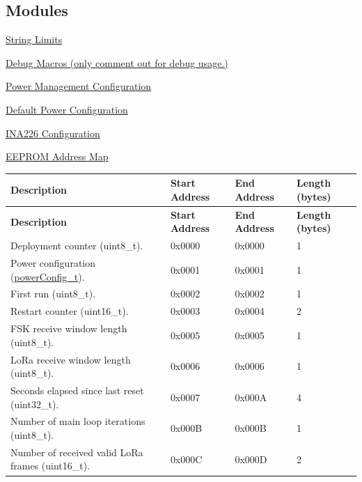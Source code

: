 \subsection*{Modules}
\begin{DoxyCompactItemize}
\item 
\hyperlink{group__defines__string__memory__limits}{String Limits}
\item 
\hyperlink{group__defines__debug__macros}{Debug Macros (only comment out for debug usage.)}
\item 
\hyperlink{group__defines__power__management__configuration}{Power Management Configuration}
\item 
\hyperlink{group__defines__default__power__configuration}{Default Power Configuration}
\item 
\hyperlink{group__defines__ina226__configuration}{I\+N\+A226 Configuration}
\item 
\hyperlink{group__defines__eeprom__address__map}{E\+E\+P\+R\+O\+M Address Map}
\begin{DoxyCompactList}\small\item\em \tabulinesep=1mm
\begin{longtabu} spread 0pt [c]{*{4}{|X[-1]}|}
\hline
\rowcolor{\tableheadbgcolor}\textbf{ Description}&\textbf{ Start Address}&\textbf{ End Address}&\textbf{ Length (bytes)  }\\
\endfirsthead
\hline
\endfoot
\hline
\rowcolor{\tableheadbgcolor}\textbf{ Description}&\textbf{ Start Address}&\textbf{ End Address}&\textbf{ Length (bytes)  }\\
\endhead
Deployment counter (uint8\+\_\+t).&0x0000&0x0000&1 \\
Power configuration (\hyperlink{unionpower_config__t}{power\+Config\+\_\+t}).&0x0001&0x0001&1 \\
First run (uint8\+\_\+t).&0x0002&0x0002&1 \\
Restart counter (uint16\+\_\+t).&0x0003&0x0004&2 \\
F\+SK receive window length (uint8\+\_\+t).&0x0005&0x0005&1 \\
Lo\+Ra receive window length (uint8\+\_\+t).&0x0006&0x0006&1 \\
Seconds elapsed since last reset (uint32\+\_\+t).&0x0007&0x000A&4 \\
Number of main loop iterations (uint8\+\_\+t).&0x000B&0x000B&1 \\
Number of received valid Lo\+Ra frames (uint16\+\_\+t).&0x000C&0x000D&2 \\

\end{longtabu}
\end{DoxyCompactList}
\end{DoxyCompactItemize}
